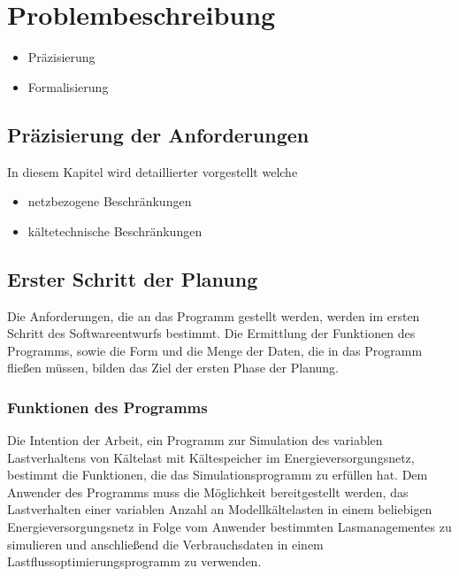 \chapter{Problembeschreibung}
\label{chap:problemstellung}
\minitoc
\begin{itemize}
\item Präzisierung
\item Formalisierung
\end{itemize}
\section{Präzisierung der Anforderungen}

In diesem Kapitel wird detaillierter vorgestellt welche 
\begin{itemize}
\item netzbezogene Beschränkungen
\item kältetechnische Beschränkungen
\end{itemize}

\section{Erster Schritt der Planung}

Die Anforderungen, die an das Programm gestellt werden, werden im ersten Schritt des Softwareentwurfs bestimmt. Die Ermittlung
der Funktionen des Programms, sowie die Form und die Menge der Daten, die in das Programm fließen müssen, bilden das Ziel der
ersten Phase der Planung.

\subsection{Funktionen des Programms}

Die Intention der Arbeit, ein Programm zur Simulation des variablen Lastverhaltens von Kältelast mit Kältespeicher im
Energieversorgungsnetz, bestimmt die Funktionen, die das Simulationsprogramm zu erfüllen hat. Dem Anwender des Programms muss
die Möglichkeit bereitgestellt werden, das Lastverhalten einer variablen Anzahl an Modellkältelasten in einem beliebigen
Energieversorgungsnetz in Folge vom Anwender bestimmten Lasmanagementes zu simulieren und anschließend die Verbrauchsdaten in
einem Lastflussoptimierungsprogramm zu verwenden.

